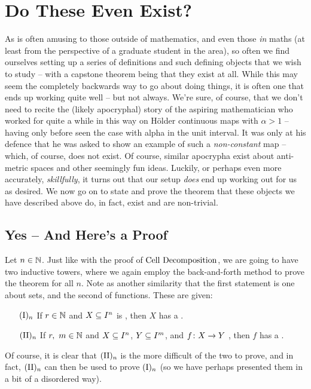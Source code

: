 \section{Do These Even Exist?}

As is often amusing to those outside of mathematics, and even those \emph{in} maths (at least from the perspective of a graduate student in the area), so often we find ourselves setting up a series of definitions and such defining objects that we wish to study -- with a capstone theorem being that they exist at all. While this may seem the completely backwards way to go about doing things, it is often one that ends up working quite well -- but not always. We're sure, of course, that we don't need to recite the (likely apocryphal) story of the aspiring mathematician who worked for quite a while in this way on H\"older continuous maps with $\alpha > 1$ -- having only before seen the case with alpha in the unit interval. It was only at his defence that he was asked to show an example of such a \emph{non-constant} map -- which, of course, does not exist. Of course, similar apocrypha exist about anti-metric spaces and other seemingly fun ideas. Luckily, or perhaps even more accurately, \emph{skillfully}, it turns out that our setup \emph{does} end up working out for us as desired. We now go on to state and prove the theorem that these objects we have described above do, in fact, exist and are non-trivial.

\subsection{Yes -- And Here's a Proof}

\begin{theorem}[Parameterization (by Binyamini \& Novikov)]
  Let $n \in \N$. Just like with the proof of $\CD$, we are going to have two inductive towers, where we again employ the back-and-forth method to prove the theorem for all $n$. Note as another similarity that the first statement is one about sets, and the second of functions. These are given:
    \begin{enumerate}[label={}]
    \item[$\In$ ] If $r \in \N$ and $\CIn[X]{n}$ is , then $X$ has a \cellrparam.
    \item[$\IIn$ ] If $r, \ m \in \N$ and $\CIn[X]{n}$, $\CIn[Y]{m}$, and $\funcdom{f}{X}{Y}$ , then $f$ has a \cellrparam.
  \end{enumerate}
  Of course, it is clear that $\IIn$ is the more difficult of the two to prove, and in fact, $\IIn$ can then be used to prove $\In$ (so we have perhaps presented them in a bit of a disordered way).
  \label{thm:existence}
\end{theorem}

